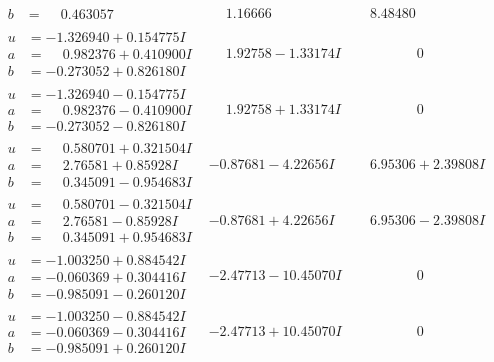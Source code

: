 \documentclass[1p]{elsarticle_modified}
\theoremstyle{definition}
\begin{document}
$$\begin{array}{c|c|c}
\begin{aligned}
b &= \phantom{-}0.463057\phantom{ +0.000000I}\end{aligned}
 & \phantom{-}1.16666\phantom{ +0.000000I} & \phantom{-}8.48480\phantom{ +0.000000I} \\ \hline\begin{aligned}
u &= -1.326940 + 0.154775 I \\
a &= \phantom{-}0.982376 + 0.410900 I \\
b &= -0.273052 + 0.826180 I\end{aligned}
 & \phantom{-}1.92758 - 1.33174 I & \phantom{-0.000000 } 0 \\ \hline\begin{aligned}
u &= -1.326940 - 0.154775 I \\
a &= \phantom{-}0.982376 - 0.410900 I \\
b &= -0.273052 - 0.826180 I\end{aligned}
 & \phantom{-}1.92758 + 1.33174 I & \phantom{-0.000000 } 0 \\ \hline\begin{aligned}
u &= \phantom{-}0.580701 + 0.321504 I \\
a &= \phantom{-}2.76581 + 0.85928 I \\
b &= \phantom{-}0.345091 - 0.954683 I\end{aligned}
 & -0.87681 - 4.22656 I & \phantom{-}6.95306 + 2.39808 I \\ \hline\begin{aligned}
u &= \phantom{-}0.580701 - 0.321504 I \\
a &= \phantom{-}2.76581 - 0.85928 I \\
b &= \phantom{-}0.345091 + 0.954683 I\end{aligned}
 & -0.87681 + 4.22656 I & \phantom{-}6.95306 - 2.39808 I \\ \hline\begin{aligned}
u &= -1.003250 + 0.884542 I \\
a &= -0.060369 + 0.304416 I \\
b &= -0.985091 - 0.260120 I\end{aligned}
 & -2.47713 - 10.45070 I & \phantom{-0.000000 } 0 \\ \hline\begin{aligned}
u &= -1.003250 - 0.884542 I \\
a &= -0.060369 - 0.304416 I \\
b &= -0.985091 + 0.260120 I\end{aligned}
 & -2.47713 + 10.45070 I & \phantom{-0.000000 } 0 \\ \hline\begin{aligned}

\end{aligned}
\end{array}$$
\end{document}
